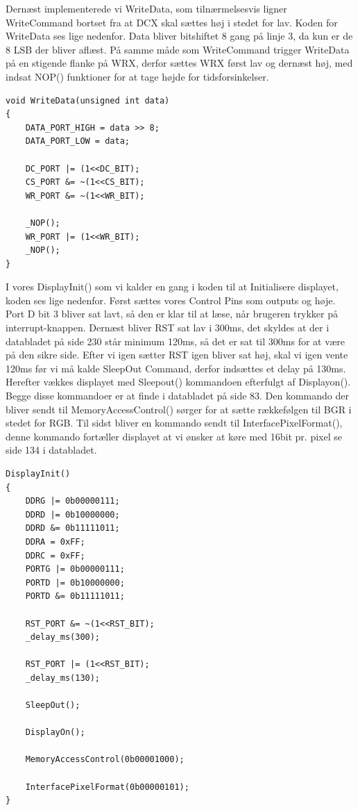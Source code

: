 Dernæst implementerede vi WriteData, som tilnærmelsesvis ligner WriteCommand bortset fra at DCX skal sættes høj i stedet for lav. Koden for WriteData ses lige nedenfor. Data bliver bitshiftet 8 gang på linje 3, da kun er de 8 LSB der bliver aflæst. På samme måde som WriteCommand trigger WriteData på en stigende flanke på WRX, derfor sættes WRX først lav og dernæst høj, med indsat NOP() funktioner for at tage højde for tidsforsinkelser. 

\begin{lstlisting}
void WriteData(unsigned int data)
{
	DATA_PORT_HIGH = data >> 8;
	DATA_PORT_LOW = data;

	DC_PORT |= (1<<DC_BIT);
	CS_PORT &= ~(1<<CS_BIT);
	WR_PORT &= ~(1<<WR_BIT);

	_NOP();
	WR_PORT |= (1<<WR_BIT);
	_NOP();
}
\end{lstlisting}


I vores DisplayInit() som vi kalder en gang i koden til at Initialisere displayet, koden ses lige nedenfor. Først sættes vores Control Pins som outputs og høje. Port D bit 3 bliver sat lavt, så den er klar til at læse, når brugeren trykker på interrupt-knappen. Dernæst bliver RST sat lav i 300ms, det skyldes at der i databladet\cite{man:ILI9341} på side 230 står minimum 120ms, så det er sat til 300ms for at være på den sikre side. Efter vi igen sætter RST igen bliver sat høj, skal vi igen vente 120ms før vi må kalde SleepOut Command, derfor indsættes et delay på 130ms. Herefter vækkes displayet med Sleepout() kommandoen efterfulgt af Displayon(). Begge disse kommandoer er at finde i databladet\cite{man:ILI9341} på side 83. Den kommando der bliver sendt til MemoryAccessControl() sørger for at sætte rækkefølgen til BGR i stedet for RGB. Til sidst bliver en kommando sendt til InterfacePixelFormat(), denne kommando fortæller displayet at vi ønsker at køre med 16bit pr. pixel se side 134 i databladet\cite{man:ILI9341}. 


\begin{lstlisting}
DisplayInit()
{
	DDRG |= 0b00000111;
	DDRD |= 0b10000000;
	DDRD &= 0b11111011;
	DDRA = 0xFF;
	DDRC = 0xFF;
	PORTG |= 0b00000111;
	PORTD |= 0b10000000;
	PORTD &= 0b11111011;
	
	RST_PORT &= ~(1<<RST_BIT);
	_delay_ms(300);

	RST_PORT |= (1<<RST_BIT);
	_delay_ms(130);
	
	SleepOut();

	DisplayOn();

	MemoryAccessControl(0b00001000);
	
	InterfacePixelFormat(0b00000101);
}
\end{lstlisting}


